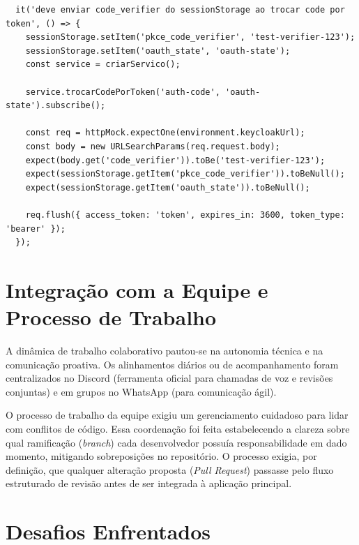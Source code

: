 \begin{center}
\begin{minipage}{0.95\textwidth}
\begin{codigo}[H]
\footnotesize
\begin{verbatim}
  it('deve enviar code_verifier do sessionStorage ao trocar code por token', () => {
    sessionStorage.setItem('pkce_code_verifier', 'test-verifier-123');
    sessionStorage.setItem('oauth_state', 'oauth-state');
    const service = criarServico();

    service.trocarCodePorToken('auth-code', 'oauth-state').subscribe();

    const req = httpMock.expectOne(environment.keycloakUrl);
    const body = new URLSearchParams(req.request.body);
    expect(body.get('code_verifier')).toBe('test-verifier-123');
    expect(sessionStorage.getItem('pkce_code_verifier')).toBeNull();
    expect(sessionStorage.getItem('oauth_state')).toBeNull();

    req.flush({ access_token: 'token', expires_in: 3600, token_type: 'bearer' });
  });
\end{verbatim}
\caption{Estrutura de teste de unidade em Angular validando o envio do PKCE.}
\label{cod:teste_unidade}
\end{codigo}
\end{minipage}
\end{center}

\section{Integração com a Equipe e Processo de Trabalho}

A dinâmica de trabalho colaborativo pautou-se na autonomia técnica e na comunicação proativa. Os alinhamentos diários ou de acompanhamento foram centralizados no Discord (ferramenta oficial para chamadas de voz e revisões conjuntas) e em grupos no WhatsApp (para comunicação ágil). 

O processo de trabalho da equipe exigiu um gerenciamento cuidadoso para lidar com conflitos de código. Essa coordenação foi feita estabelecendo a clareza sobre qual ramificação (\textit{branch}) cada desenvolvedor possuía responsabilidade em dado momento, mitigando sobreposições no repositório. O processo exigia, por definição, que qualquer alteração proposta (\textit{Pull Request}) passasse pelo fluxo estruturado de revisão antes de ser integrada à aplicação principal.

\section{Desafios Enfrentados}

